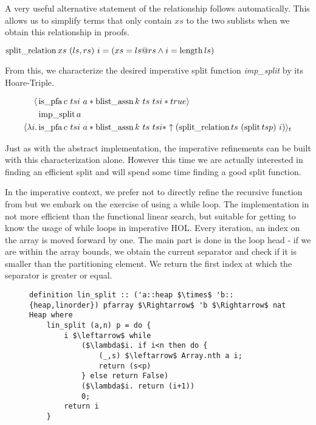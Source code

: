 A very useful alternative statement of the relationship follows automatically.
This allows us to simplify terms that only contain $xs$
to the two sublists when we obtain this relationship in proofs.

\begin{lemma}
    $\operatorname{split\_relation} xs\ (ls,rs)\ i = (xs = ls@rs \wedge i = \operatorname{length} ls)$
\end{lemma}

From this, we characterize the desired imperative
split function \textit{imp\_split} by its Hoare-Triple.

\begin{align*}
    \langle & \operatorname{is\_pfa} c\ tsi\ a * \operatorname{blist\_assn} k\ ts\ tsi *  true \rangle \\
            & \operatorname{imp\_split} a \\
\langle\lambda i. & \operatorname{is\_pfa} c\ tsi\ a * \operatorname{blist\_assn} k\ ts\ tsi * \uparrow(\operatorname{split\_relation} ts\ (\operatorname{split} ts p)\ i)\rangle_t
\end{align*}

Just as with the abstract implementation,
the imperative refinements can be built with this characterization alone.
However this time we are actually interested in finding an
efficient split and will spend some time finding
a good split function.

In the imperative context, we prefer not to directly
refine the recursive function from 
but we embark on the exercise of using a while loop.
The implementation in 
not more efficient than the functional linear search,
but suitable for getting to know
the usage of while loops in imperative HOL.
Every iteration, an index on the array is moved forward by one.
The main part is done in the loop head - if we
are within the array bounds,
we obtain the current separator and check if it is
smaller than the partitioning element.
We return the first index at which the separator is greater or equal.

\begin{figure}
\begin{lstlisting}[mathescape=true, language=Isabelle, caption={The imperative linear split},
    label={lst:imp-linear-split}]
definition lin_split :: ('a::heap $\times$ 'b::{heap,linorder}) pfarray $\Rightarrow$ 'b $\Rightarrow$ nat Heap where
    lin_split (a,n) p = do { 
        i $\leftarrow$ while  
            ($\lambda$i. if i<n then do { 
                (_,s) $\leftarrow$ Array.nth a i; 
                return (s<p) 
            } else return False)  
            ($\lambda$i. return (i+1))  
            0; 
        return i 
    }
\end{lstlisting}
\end{figure}

